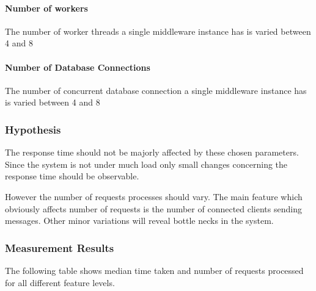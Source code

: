 \documentclass[milestone1.tex]{subfiles}
\begin{document}
\paragraph{Number of workers}

The number of worker threads a single middleware instance has is varied between 4 and 8

\paragraph{Number of Database Connections}

The number of concurrent database connection a single middleware instance has is varied between 4 and 8


\subsubsection{Hypothesis}

The response time should not be majorly affected by these chosen parameters. Since the system is not under much load only small changes concerning the response time should be observable.

However the number of requests processes should vary. The main feature which obviously affects number of requests is the number of connected clients sending messages. Other minor variations will reveal bottle necks in the system.

\subsubsection{Measurement Results}
The following table shows median time taken and number of requests processed for all different feature levels.\\
\end{document}
